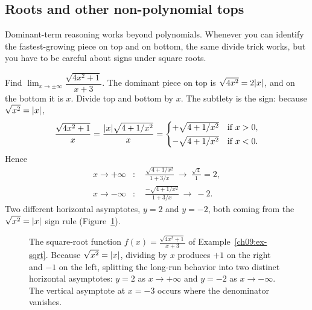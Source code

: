 \subsection{Roots and other non-polynomial tops}

Dominant-term reasoning works beyond polynomials. Whenever
you can identify the fastest-growing piece on top and on bottom, the same divide
trick works, but you have to be careful about signs under square roots.

\begin{example}
\label{ch09:ex-sqrt}
Find $\lim_{x\to\pm\infty}\dfrac{\sqrt{4x^2+1}}{x+3}$.
The dominant piece on top is $\sqrt{4x^2}=2\lvert x\rvert$, and on the bottom it is $x$.
Divide top and bottom by $x$. The subtlety is the sign: because
$\sqrt{x^2}=\lvert x\rvert$,
\[
  \frac{\sqrt{4x^2+1}}{x} = \frac{\lvert x\rvert\sqrt{4+1/x^2}}{x}
  = \begin{cases}
      +\sqrt{4+1/x^2} & \text{if } x>0,\\[2pt]
      -\sqrt{4+1/x^2} & \text{if } x<0.
    \end{cases}
\]
Hence
\begin{align*}
  x\to+\infty&:\quad \frac{\sqrt{4+1/x^2}}{1+3/x}\ \to\ \frac{\sqrt 4}{1}=2,\\
  x\to-\infty&:\quad \frac{-\sqrt{4+1/x^2}}{1+3/x}\ \to\ -2 .
\end{align*}
Two different horizontal asymptotes, $y=2$ and $y=-2$, both coming from the
$\sqrt{x^2}=\lvert x\rvert$ sign rule (Figure~\ref{ch09:fig-sqrt-two-asymptotes}).
\end{example}

\begin{figure}[htbp]
\centering
{}
\caption{The square-root function $f(x)=\frac{\sqrt{4x^2+1}}{x+3}$ of Example~\ref{ch09:ex-sqrt}.
Because $\sqrt{x^2}=\lvert x\rvert$, dividing by $x$ produces $+1$ on the right and $-1$ on the left,
splitting the long-run behavior into two distinct horizontal asymptotes: $y=2$ as $x\to+\infty$
and $y=-2$ as $x\to-\infty$. The vertical asymptote at $x=-3$ occurs where the denominator vanishes.}
\label{ch09:fig-sqrt-two-asymptotes}
\end{figure}

